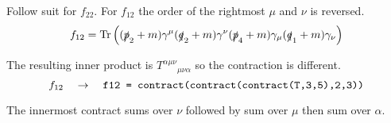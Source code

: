 \documentclass[12pt]{article}
\begin{document}
Follow suit for $f_{22}$.
For $f_{12}$ the order of the rightmost $\mu$ and $\nu$ is reversed.
\begin{equation*}
f_{12}=\mathop{\rm Tr}
\left(
(\slashed{p}_2+m)\gamma^\mu(\slashed{q}_2+m)\gamma^\nu(\slashed{p}_4+m)\gamma_\mu(\slashed{q}_1+m)\gamma_\nu
\right)
\end{equation*}

The resulting inner product is $T^{\alpha\mu\nu}{}_{\mu\nu\alpha}$
so the contraction is different.
\begin{equation*}
f_{12}
\quad\rightarrow\quad
\text{\tt f12 = contract(contract(contract(T,3,5),2,3))}
\end{equation*}

The innermost contract sums over $\nu$ followed by sum over $\mu$ then sum over $\alpha$.
\end{document}

